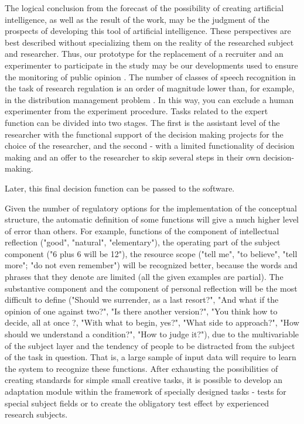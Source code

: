 \documentclass[conference]{IEEEtran}
\begin{document}
	The logical conclusion from the forecast of the possibility of creating artificial intelligence, as well as the result of the work, may be the judgment of the prospects of developing this tool of artificial intelligence. These perspectives are best described without specializing them on the reality of the researched subject and researcher. Thus, our prototype for the replacement of a recruiter and an experimenter to participate in the study may be our developments used to ensure the monitoring of public opinion \cite{b17,b18,b19}. The number of classes of speech recognition in the task of research regulation  is an order of magnitude lower than, for example, in the distribution management problem \cite{b22}. In this way, you can exclude a human experimenter from the experiment procedure. Tasks related to the expert function can be divided into two stages. The first is the assistant level of the researcher with the functional support of the decision making projects for the choice of the researcher, and the second - with a limited functionality of decision making and an offer to the researcher to skip several steps in their own decision-making.
	
	Later, this final decision function can be passed to the software.
	
	Given the number of regulatory options for the implementation of the conceptual structure, the automatic definition of some functions will give a much higher level of error than others. For example, functions of the component of intellectual reflection ("good", "natural", "elementary"), the operating part of the subject component ("6 plus 6 will be 12"), the resource scope ("tell me", "to believe", "tell more"; "do not even remember") will be recognized better, because the words and phrases that they denote are limited (all the given examples are partial).
	The substantive component and the component of personal reflection will be the most difficult to define ("Should we surrender, as a last resort?", "And what if the opinion of one against two?", "Is there another version?", "You think how to decide, all at once ?, "With what to begin, yes?", "What side to approach?", "How should we understand a condition?", "How to judge it?"), due to the multivariable of the subject layer and the tendency of people to be distracted from the subject of the task in question. That is, a large sample of input data will require to learn the system to recognize these functions. After exhausting the possibilities of creating standards for simple small creative tasks, it is possible to develop an adaptation module within the framework of specially designed tasks - tests for special subject fields or to create the obligatory test effect by experienced research subjects.
	
\end{document}
